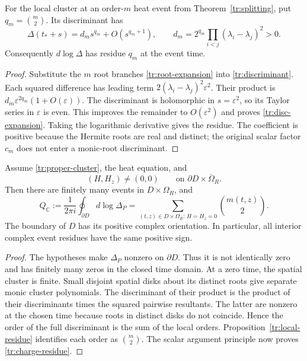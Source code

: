\begin{proposition}\label{tr:local-residue}
For the local cluster at an order-$m$ heat event from
Theorem~\ref{tr:splitting}, put $q_m=\binom m2$.  Its discriminant has
\begin{equation}\label{tr:disc-expansion}
 \Delta(t_*+s)=d_m s^{q_m}+O(s^{q_m+1}),\qquad
 d_m=2^{q_m}\prod_{i<j}(\lambda_i-\lambda_j)^2>0.
\end{equation}
Consequently $d\log\Delta$ has residue $q_m$ at the event time.
\end{proposition}

\begin{proof}
Substitute the $m$ root branches \eqref{tr:root-expansion} into
\eqref{tr:discriminant}.  Each squared difference has leading term
$2(\lambda_i-\lambda_j)^2\varepsilon^2$.  Their product is
$d_m\varepsilon^{2q_m}(1+O(\varepsilon))$.  The discriminant is
holomorphic in $s=\varepsilon^2$, so its Taylor series in $\varepsilon$
is even.  This improves the remainder to $O(\varepsilon^2)$ and proves
\eqref{tr:disc-expansion}.  Taking the logarithmic derivative gives the
residue.  The coefficient is positive because the Hermite roots are
real and distinct; the original scalar factor $c_m$ does not enter a
monic-root discriminant.
\end{proof}

\begin{theorem}\label{tr:complex-charge}
Assume \eqref{tr:proper-cluster}, the heat equation, and
\[
 (H,H_z)\ne(0,0)\qquad
             \text{on }\partial D\times\overline\Omega_R.
\]
Then there are finitely many events in $D\times\Omega_R$, and
\begin{equation}\label{tr:charge-residue}
 Q_{\mathbb C}:=\frac1{2\pi i}\oint_{\partial D}d\log\Delta_P
  =\sum_{(t,z)\in D\times\Omega_R:\,H=H_z=0}\binom{m(t,z)}2.
\end{equation}
The boundary of $D$ has its positive complex orientation.  In particular,
all interior complex event residues have the same positive sign.
\end{theorem}

\begin{proof}
The hypotheses make $\Delta_P$ nonzero on $\partial D$.  Thus it is not
identically zero and has finitely many zeros in the closed time domain.
At a zero time, the spatial cluster is finite.  Small disjoint spatial
disks about its distinct roots give separate monic cluster polynomials.
The discriminant of their product is the product of their discriminants
times the squared pairwise resultants.  The latter are nonzero at the
chosen time because roots in distinct disks do not coincide.  Hence the
order of the full discriminant is the sum of the local orders.
Proposition~\ref{tr:local-residue} identifies each order as
$\binom m2$.  The scalar argument principle now proves
\eqref{tr:charge-residue}.
\end{proof}

